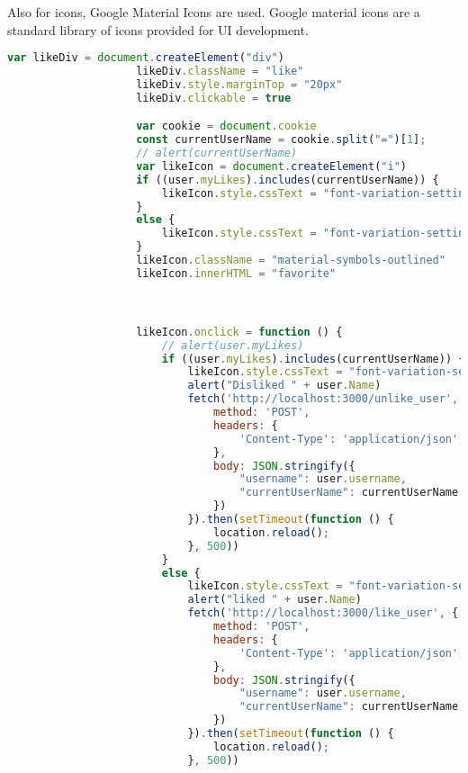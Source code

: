 \documentclass{article}
\begin{document}
Also for icons, Google Material Icons are used. Google material icons are a standard library of icons provided for UI development.
\begin{lstlisting}[language=javascript]
    var likeDiv = document.createElement("div")
                    likeDiv.className = "like"
                    likeDiv.style.marginTop = "20px"
                    likeDiv.clickable = true

                    var cookie = document.cookie
                    const currentUserName = cookie.split("=")[1];
                    // alert(currentUserName)
                    var likeIcon = document.createElement("i")
                    if ((user.myLikes).includes(currentUserName)) {
                        likeIcon.style.cssText = "font-variation-settings: 'FILL' 1;"
                    }
                    else {
                        likeIcon.style.cssText = "font-variation-settings: 'FILL' 0;"
                    }
                    likeIcon.className = "material-symbols-outlined"
                    likeIcon.innerHTML = "favorite"



                    likeIcon.onclick = function () {
                        // alert(user.myLikes)
                        if ((user.myLikes).includes(currentUserName)) {
                            likeIcon.style.cssText = "font-variation-settings: 'FILL' 0;"
                            alert("Disliked " + user.Name)
                            fetch('http://localhost:3000/unlike_user', {
                                method: 'POST',
                                headers: {
                                    'Content-Type': 'application/json',
                                },
                                body: JSON.stringify({
                                    "username": user.username,
                                    "currentUserName": currentUserName
                                })
                            }).then(setTimeout(function () {
                                location.reload();
                            }, 500))
                        }
                        else {
                            likeIcon.style.cssText = "font-variation-settings: 'FILL' 1;"
                            alert("liked " + user.Name)
                            fetch('http://localhost:3000/like_user', {
                                method: 'POST',
                                headers: {
                                    'Content-Type': 'application/json',
                                },
                                body: JSON.stringify({
                                    "username": user.username,
                                    "currentUserName": currentUserName
                                })
                            }).then(setTimeout(function () {
                                location.reload();
                            }, 500))
                            

\end{lstlisting}
\end{document}
